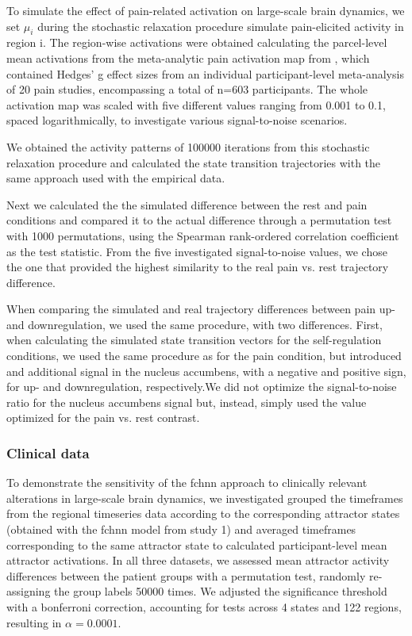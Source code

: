 \documentclass{article}
\begin{document}
To simulate the effect of pain-related activation on large-scale brain dynamics, we set $\mu_i$ during the stochastic relaxation procedure simulate pain-elicited activity in region i. The region-wise activations were obtained calculating the parcel-level mean activations from the meta-analytic pain activation map from \citep{zunhammer2021meta}, which contained Hedges' g effect sizes from an individual participant-level meta-analysis of 20 pain studies, encompassing a total of n=603 participants. The whole activation map was scaled with five different values ranging from 0.001 to 0.1, spaced logarithmically, to investigate various signal-to-noise scenarios.

We obtained the activity patterns of 100000 iterations from this stochastic relaxation procedure and calculated the state transition trajectories with the same approach used with the empirical data.

Next we calculated the the simulated difference between the rest and pain conditions and compared it to the actual difference through a permutation test with 1000 permutations, using the Spearman rank-ordered correlation coefficient as the test statistic.
From the five investigated signal-to-noise values, we chose the one that provided the highest similarity to the real pain vs. rest trajectory difference.

When comparing the simulated and real trajectory differences between pain up- and downregulation, we used the same procedure, with two differences. First, when calculating the simulated state transition vectors for the self-regulation conditions, we used the same procedure as for the pain condition, but introduced and additional signal in the nucleus accumbens, with a negative and positive sign, for  up- and downregulation, respectively.We did not optimize the signal-to-noise ratio for the nucleus accumbens signal but, instead, simply used the value optimized for the pain vs. rest contrast.

\subsubsection{Clinical data}\label{Clinical data}

To demonstrate the sensitivity of the \acrshort{fchnn} approach to clinically relevant alterations in large-scale brain dynamics, we investigated grouped the timeframes from the regional timeseries data according to the corresponding attractor states (obtained with the \acrshort{fchnn} model from study 1) and averaged timeframes corresponding to the same attractor state to calculated participant-level mean attractor activations.
In all three datasets, we assessed mean attractor activity differences between the patient groups with a permutation test, randomly re-assigning the group labels 50000 times.
We adjusted the significance threshold with a bonferroni correction, accounting for tests across 4 states and 122 regions, resulting in $\alpha = 0.0001$.
\end{document}

